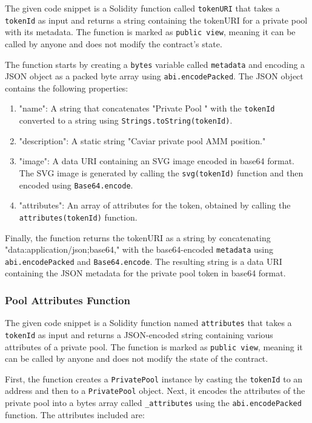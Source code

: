 The given code snippet is a Solidity function called \texttt{tokenURI}
that takes a \texttt{tokenId} as input and returns a string containing
the tokenURI for a private pool with its metadata. The function is
marked as \texttt{public\ view}, meaning it can be called by anyone and
does not modify the contract's state.

The function starts by creating a \texttt{bytes} variable called
\texttt{metadata} and encoding a JSON object as a packed byte array
using \texttt{abi.encodePacked}. The JSON object contains the following
properties:

\begin{enumerate}
\def\labelenumi{\arabic{enumi}.}
\tightlist
\item
  "name": A string that concatenates "Private Pool " with the
  \texttt{tokenId} converted to a string using
  \texttt{Strings.toString(tokenId)}.
\item
  "description": A static string "Caviar private pool AMM position."
\item
  "image": A data URI containing an SVG image encoded in base64 format.
  The SVG image is generated by calling the \texttt{svg(tokenId)}
  function and then encoded using \texttt{Base64.encode}.
\item
  "attributes": An array of attributes for the token, obtained by
  calling the \texttt{attributes(tokenId)} function.
\end{enumerate}

Finally, the function returns the tokenURI as a string by concatenating
"data:application/json;base64," with the base64-encoded
\texttt{metadata} using \texttt{abi.encodePacked} and
\texttt{Base64.encode}. The resulting string is a data URI containing
the JSON metadata for the private pool token in base64 format.

\hypertarget{pool-attributes-function}{%
\subsubsection{Pool Attributes
Function}\label{pool-attributes-function}}

The given code snippet is a Solidity function named \texttt{attributes}
that takes a \texttt{tokenId} as input and returns a JSON-encoded string
containing various attributes of a private pool. The function is marked
as \texttt{public\ view}, meaning it can be called by anyone and does
not modify the state of the contract.

First, the function creates a \texttt{PrivatePool} instance by casting
the \texttt{tokenId} to an address and then to a \texttt{PrivatePool}
object. Next, it encodes the attributes of the private pool into a bytes
array called \texttt{\_attributes} using the \texttt{abi.encodePacked}
function. The attributes included are:

